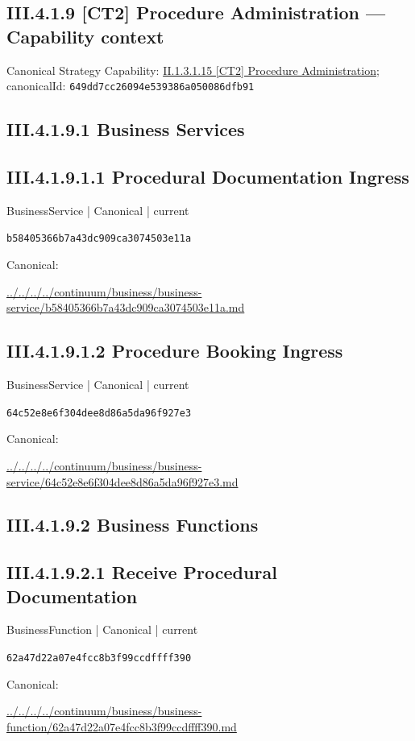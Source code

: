 \documentclass[10pt,a4paper]{article}
\begin{document}
\subsection*{III.4.1.9 [CT2] Procedure Administration — Capability context}
Canonical Strategy Capability: \hyperref[element-649dd7cc26094e539386a050086dfb91]{II.1.3.1.15 [CT2] Procedure Administration}; canonicalId: \texttt{649dd7cc26094e539386a050086dfb91}\par
\subsection*{III.4.1.9.1 Business Services}
\subsection*{III.4.1.9.1.1 Procedural Documentation Ingress}
\label{element-b58405366b7a43dc909ca3074503e11a}
{\small BusinessService | Canonical | current}\par
\texttt{b58405366b7a43dc909ca3074503e11a}\par
Canonical: \par
{\footnotesize\url{../../../../continuum/business/business-service/b58405366b7a43dc909ca3074503e11a.md}}\par
\subsection*{III.4.1.9.1.2 Procedure Booking Ingress}
\label{element-64c52e8e6f304dee8d86a5da96f927e3}
{\small BusinessService | Canonical | current}\par
\texttt{64c52e8e6f304dee8d86a5da96f927e3}\par
Canonical: \par
{\footnotesize\url{../../../../continuum/business/business-service/64c52e8e6f304dee8d86a5da96f927e3.md}}\par
\subsection*{III.4.1.9.2 Business Functions}
\subsection*{III.4.1.9.2.1 Receive Procedural Documentation}
\label{element-62a47d22a07e4fcc8b3f99ccdffff390}
{\small BusinessFunction | Canonical | current}\par
\texttt{62a47d22a07e4fcc8b3f99ccdffff390}\par
Canonical: \par
{\footnotesize\url{../../../../continuum/business/business-function/62a47d22a07e4fcc8b3f99ccdffff390.md}}\par
\end{document}

